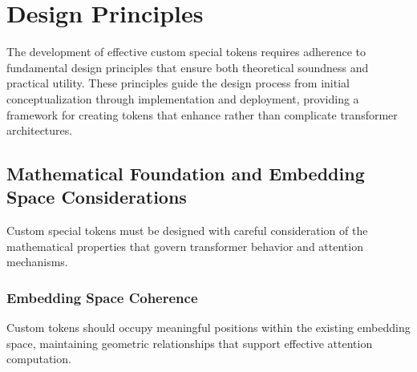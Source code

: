 
\section{Design Principles}

The development of effective custom special tokens requires adherence to fundamental design principles that ensure both theoretical soundness and practical utility. These principles guide the design process from initial conceptualization through implementation and deployment, providing a framework for creating tokens that enhance rather than complicate transformer architectures.

\subsection{Mathematical Foundation and Embedding Space Considerations}

Custom special tokens must be designed with careful consideration of the mathematical properties that govern transformer behavior and attention mechanisms.

\subsubsection{Embedding Space Coherence}

Custom tokens should occupy meaningful positions within the existing embedding space, maintaining geometric relationships that support effective attention computation.

